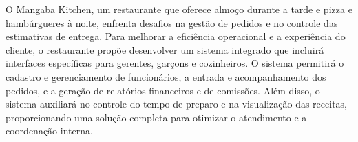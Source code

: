 \hspace{4.5mm}
O Mangaba Kitchen, um restaurante que oferece almoço durante a tarde e pizza e hambúrgueres à noite, enfrenta desafios na gestão de pedidos e no controle das estimativas de entrega. Para melhorar a eficiência operacional e a experiência do cliente, o restaurante propõe desenvolver um sistema integrado que incluirá interfaces específicas para gerentes, garçons e cozinheiros. O sistema permitirá o cadastro e gerenciamento de funcionários, a entrada e acompanhamento dos pedidos, e a geração de relatórios financeiros e de comissões. Além disso, o sistema auxiliará no controle do tempo de preparo e na visualização das receitas, proporcionando uma solução completa para otimizar o atendimento e a coordenação interna.